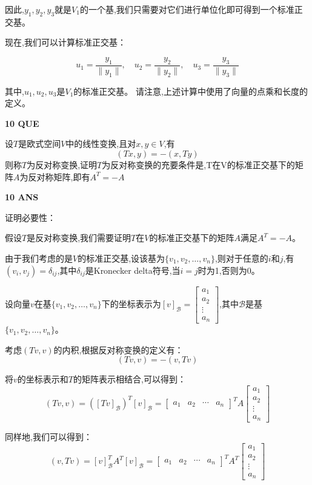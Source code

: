 \documentclass[11pt,letterpaper]{ctexart}
\begin{document}
\begin{enumerate}
因此,$y_1, y_2, y_3$就是$V_1$的一个基,我们只需要对它们进行单位化即可得到一个标准正交基。


现在,我们可以计算标准正交基：

\[
u_1 = \frac{y_1}{\|y_1\|}, \quad u_2 = \frac{y_2}{\|y_2\|}, \quad u_3 = \frac{y_3}{\|y_3\|}
\]

其中,$u_1, u_2, u_3$是$V_1$的标准正交基。
请注意,上述计算中使用了向量的点乘和长度的定义。

\textbf{10 QUE}
\bigskip

设$T$是欧式空间$V$中的线性变换,且对$x, y \in V$,有
\[ (Tx, y) = -(x, Ty)\]
则称$T$为反对称变换,证明$T$为反对称变换的充要条件是,T在V的标准正交基下的矩阵$A$为反对称矩阵,即有$A^T = -A$

\textbf{10 ANS}
\bigskip


证明必要性：

假设$T$是反对称变换,我们需要证明$T$在$V$的标准正交基下的矩阵$A$满足$A^T = -A$。

由于我们考虑的是$V$的标准正交基,设该基为$\{v_1, v_2, \ldots, v_n\}$,则对于任意的$i$和$j$,有$(v_i, v_j) = \delta_{ij}$,其中$\delta_{ij}$是Kronecker delta符号,当$i=j$时为1,否则为0。

设向量$v$在基$\{v_1, v_2, \ldots, v_n\}$下的坐标表示为$[v]_\mathcal{B} = \begin{bmatrix} a_1 \\ a_2 \\ \vdots \\ a_n \end{bmatrix}$,其中$\mathcal{B}$是基$\{v_1, v_2, \ldots, v_n\}$。

考虑$(Tv, v)$的内积,根据反对称变换的定义有：
\[(Tv, v) = -(v, Tv)\]

将$v$的坐标表示和$T$的矩阵表示相结合,可以得到：
\[(Tv, v) = ([Tv]_\mathcal{B})^T [v]_\mathcal{B} = \begin{bmatrix} a_1 & a_2 & \cdots & a_n \end{bmatrix}^T A \begin{bmatrix} a_1 \\ a_2 \\ \vdots \\ a_n \end{bmatrix}\]

同样地,我们可以得到：
\[(v, Tv) = [v]_\mathcal{B}^T A^T [v]_\mathcal{B} = \begin{bmatrix} a_1 & a_2 & \cdots & a_n \end{bmatrix}^T A^T \begin{bmatrix} a_1 \\ a_2 \\ \vdots \\ a_n \end{bmatrix}\]


\end{enumerate}
\end{document}
